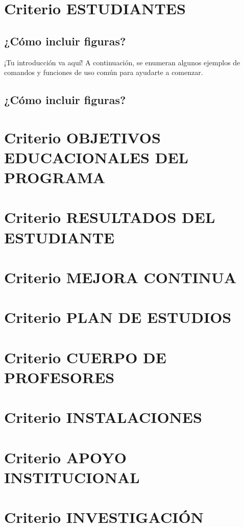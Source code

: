 \documentclass[12pt,a4paper]{report}
\begin{document}
\section{Criterio ESTUDIANTES}
\subsection{¿Cómo incluir figuras?}
¡Tu introducción va aquí! A continuación, se enumeran algunos ejemplos de comandos y funciones de uso común para ayudarte a comenzar.
\subsection{¿Cómo incluir figuras?}
\section{ Criterio OBJETIVOS EDUCACIONALES DEL PROGRAMA}

\section{ Criterio RESULTADOS DEL ESTUDIANTE}

\section{ Criterio MEJORA CONTINUA}

\section{ Criterio PLAN DE ESTUDIOS  }

\section{ Criterio CUERPO DE PROFESORES}

\section{ Criterio INSTALACIONES}

\section{ Criterio APOYO INSTITUCIONAL}

\section{ Criterio INVESTIGACIÓN}
\end{document}
